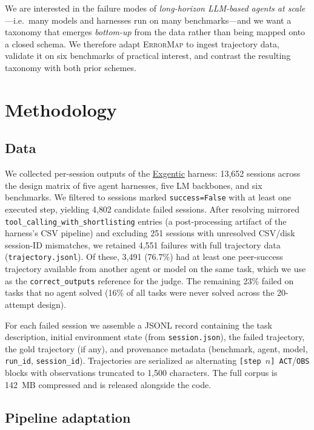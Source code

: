 \documentclass[11pt]{article}
\begin{document}
We are interested in the failure modes of \emph{long-horizon
LLM-based agents at scale}---i.e.\ many models and harnesses run on
many benchmarks---and we want a taxonomy that emerges
\emph{bottom-up} from the data rather than being mapped onto a
closed schema. We therefore adapt \textsc{ErrorMap} to ingest
trajectory data, validate it on six benchmarks of practical
interest, and contrast the resulting taxonomy with both prior
schemes.

\section{Methodology}

\subsection{Data}

We collected per-session outputs of the
\href{https://github.com/Exgentic/experiments}{Exgentic} harness:
13{,}652 sessions across the design matrix of five agent
harnesses, five LM backbones, and six benchmarks. We filtered to
sessions marked \texttt{success=False} with at least one executed
step, yielding 4{,}802 candidate failed sessions. After resolving
mirrored \texttt{tool\_calling\_with\_shortlisting} entries (a
post-processing artifact of the harness's CSV pipeline) and
excluding 251 sessions with unresolved CSV/disk session-ID
mismatches, we retained 4{,}551 failures with full trajectory data
(\texttt{trajectory.jsonl}). Of these, 3{,}491 (76.7\%) had at
least one peer-success trajectory available from another agent or
model on the same task, which we use as the \texttt{correct\_outputs}
reference for the judge. The remaining 23\% failed on tasks that no
agent solved (16\% of all tasks were never solved across the
20-attempt design).

For each failed session we assemble a JSONL record containing the
task description, initial environment state (from
\texttt{session.json}), the failed trajectory, the gold trajectory
(if any), and provenance metadata (benchmark, agent, model,
\texttt{run\_id}, \texttt{session\_id}). Trajectories are serialized
as alternating \texttt{[step $n$] ACT}/\texttt{OBS} blocks with
observations truncated to 1{,}500 characters. The full corpus is
142~MB compressed and is released alongside the code.

\subsection{Pipeline adaptation}
\end{document}
